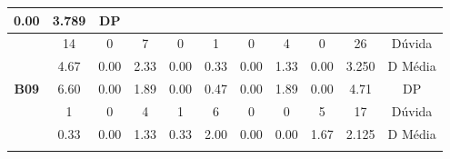 \begin{table}[htbp]
\begin{tabular}{|ccccccccccc|}
		\multicolumn{1}{c|}{\cellcolor[HTML]{D9D9D9}0.00} &
		\multicolumn{1}{c|}{\cellcolor[HTML]{D9D9D9}3.789} &
		DP \\ \hline
		\multicolumn{1}{|c|}{\cellcolor[HTML]{F2F2F2}} &
		\multicolumn{1}{c|}{14} &
		\multicolumn{1}{c|}{0} &
		\multicolumn{1}{c|}{7} &
		\multicolumn{1}{c|}{0} &
		\multicolumn{1}{c|}{1} &
		\multicolumn{1}{c|}{0} &
		\multicolumn{1}{c|}{4} &
		\multicolumn{1}{c|}{0} &
		\multicolumn{1}{c|}{26} &
		Dúvida \\ \cline{2-11} 
		\rowcolor[HTML]{D9D9D9} 
		\multicolumn{1}{|c|}{\cellcolor[HTML]{F2F2F2}} &
		\multicolumn{1}{c|}{\cellcolor[HTML]{D9D9D9}4.67} &
		\multicolumn{1}{c|}{\cellcolor[HTML]{D9D9D9}0.00} &
		\multicolumn{1}{c|}{\cellcolor[HTML]{D9D9D9}2.33} &
		\multicolumn{1}{c|}{\cellcolor[HTML]{D9D9D9}0.00} &
		\multicolumn{1}{c|}{\cellcolor[HTML]{D9D9D9}0.33} &
		\multicolumn{1}{c|}{\cellcolor[HTML]{D9D9D9}0.00} &
		\multicolumn{1}{c|}{\cellcolor[HTML]{D9D9D9}1.33} &
		\multicolumn{1}{c|}{\cellcolor[HTML]{D9D9D9}0.00} &
		\multicolumn{1}{c|}{\cellcolor[HTML]{D9D9D9}3.250} &
		D Média \\ \cline{2-11} 
		\multicolumn{1}{|c|}{\multirow{-3}{*}{\cellcolor[HTML]{F2F2F2}\textbf{B09}}} &
		\multicolumn{1}{c|}{6.60} &
		\multicolumn{1}{c|}{0.00} &
		\multicolumn{1}{c|}{1.89} &
		\multicolumn{1}{c|}{0.00} &
		\multicolumn{1}{c|}{0.47} &
		\multicolumn{1}{c|}{0.00} &
		\multicolumn{1}{c|}{1.89} &
		\multicolumn{1}{c|}{0.00} &
		\multicolumn{1}{c|}{4.71} &
		DP \\ \hline
		\rowcolor[HTML]{D9D9D9} 
		\multicolumn{1}{|c|}{\cellcolor[HTML]{F2F2F2}} &
		\multicolumn{1}{c|}{\cellcolor[HTML]{D9D9D9}1} &
		\multicolumn{1}{c|}{\cellcolor[HTML]{D9D9D9}0} &
		\multicolumn{1}{c|}{\cellcolor[HTML]{D9D9D9}4} &
		\multicolumn{1}{c|}{\cellcolor[HTML]{D9D9D9}1} &
		\multicolumn{1}{c|}{\cellcolor[HTML]{D9D9D9}6} &
		\multicolumn{1}{c|}{\cellcolor[HTML]{D9D9D9}0} &
		\multicolumn{1}{c|}{\cellcolor[HTML]{D9D9D9}0} &
		\multicolumn{1}{c|}{\cellcolor[HTML]{D9D9D9}5} &
		\multicolumn{1}{c|}{\cellcolor[HTML]{D9D9D9}17} &
		Dúvida \\ \cline{2-11} 
		\multicolumn{1}{|c|}{\cellcolor[HTML]{F2F2F2}} &
		\multicolumn{1}{c|}{0.33} &
		\multicolumn{1}{c|}{0.00} &
		\multicolumn{1}{c|}{1.33} &
		\multicolumn{1}{c|}{0.33} &
		\multicolumn{1}{c|}{2.00} &
		\multicolumn{1}{c|}{0.00} &
		\multicolumn{1}{c|}{0.00} &
		\multicolumn{1}{c|}{1.67} &
		\multicolumn{1}{c|}{2.125} &
		D Média \\ \cline{2-11} 
		\rowcolor[HTML]{D9D9D9} 
		\multicolumn{1}{|c|}{\multirow{-3}{*}{\cellcolor[HTML]{F2F2F2}\textbf{B10}}} &

\end{tabular}
\end{table}
